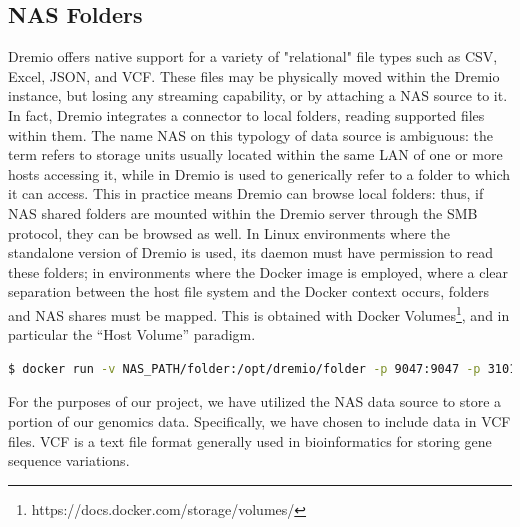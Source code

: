 \subsection{NAS Folders}
Dremio offers native support for a variety of "relational" file types such as \ac{CSV}, Excel, \ac{JSON}, and \ac{VCF}. These files may be physically moved within the Dremio instance, but losing any streaming capability, or by attaching a \ac{NAS} source to it. In fact, Dremio integrates a connector to local folders, reading supported files within them. The name \ac{NAS} on this typology of data source is ambiguous: the term refers to storage units usually located within the same \ac{LAN} of one or more hosts accessing it, while in Dremio is used to generically refer to a folder to which it can access.
This in practice means Dremio can browse local folders: thus, if \ac{NAS} shared folders are mounted within the Dremio server through the \ac{SMB} protocol, they can be browsed as well.
In Linux environments where the standalone version of Dremio is used, its daemon must have permission to read these folders; in environments where the Docker image is employed, where a clear separation between the host file system and the Docker context occurs, folders and \ac{NAS} shares must be mapped. This is obtained with Docker Volumes\footnote{ https://docs.docker.com/storage/volumes/}, and in particular the “Host Volume” paradigm.
\begin{lstlisting}[language=bash, caption={Docker command to run a Dremio container with a Host Volume}, label={lst:docker-host-volume}]
$ docker run -v NAS_PATH/folder:/opt/dremio/folder -p 9047:9047 -p 31010:31010 -p 45678:45678 -p 32010:32010 --name hereditary_dremio dremio/dremio-oss
\end{lstlisting}
For the purposes of our project, we have utilized the \ac{NAS} data source to store a portion of our genomics data. Specifically, we have chosen to include data in \ac{VCF} files. \ac{VCF} is a text file format generally used in bioinformatics for storing gene sequence variations.

